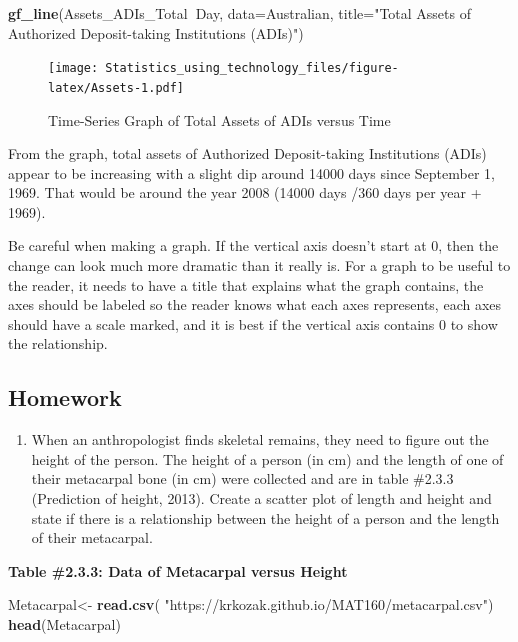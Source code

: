 \documentclass[
]{book}
\newenvironment{Shaded}{\begin{snugshade}}{\end{snugshade}}
\newcommand{\DataTypeTok}[1]{\textcolor[rgb]{0.13,0.29,0.53}{#1}}
\newcommand{\KeywordTok}[1]{\textcolor[rgb]{0.13,0.29,0.53}{\textbf{#1}}}
\newcommand{\NormalTok}[1]{#1}
\newcommand{\OperatorTok}[1]{\textcolor[rgb]{0.81,0.36,0.00}{\textbf{#1}}}
\newcommand{\StringTok}[1]{\textcolor[rgb]{0.31,0.60,0.02}{#1}}
\providecommand{\tightlist}{%
  \setlength{\itemsep}{0pt}\setlength{\parskip}{0pt}}
\begin{document}
\begin{Shaded}
\begin{Highlighting}[]
\KeywordTok{gf_line}\NormalTok{(Assets_ADIs_Total}\OperatorTok{~}\NormalTok{Day, }\DataTypeTok{data=}\NormalTok{Australian, }\DataTypeTok{title=}\StringTok{"Total Assets of Authorized Deposit-taking Institutions (ADIs)"}\NormalTok{)}
\end{Highlighting}
\end{Shaded}

\begin{figure}
\centering
\texttt{[image: Statistics\_using\_technology\_files/figure-latex/Assets-1.pdf]}
\caption{\label{fig:Assets}Time-Series Graph of Total Assets of ADIs versus Time}
\end{figure}

From the graph, total assets of Authorized Deposit-taking Institutions (ADIs) appear to be increasing with a slight dip around 14000 days since September 1, 1969. That would be around the year 2008 (14000 days /360 days per year + 1969).

Be careful when making a graph. If the vertical axis doesn't start at 0, then the change can look much more dramatic than it really is. For a graph to be useful to the reader, it needs to have a title that explains what the graph contains, the axes should be labeled so the reader knows what each axes represents, each axes should have a scale marked, and it is best if the vertical axis contains 0 to show the relationship.

\hypertarget{homework-2}{%
\subsection{Homework}\label{homework-2}}

\begin{enumerate}
\def\labelenumi{\arabic{enumi}.}
\tightlist
\item
  When an anthropologist finds skeletal remains, they need to figure out the height of the person. The height of a person (in cm) and the length of one of their metacarpal bone (in cm) were collected and are in table \#2.3.3 (Prediction of height, 2013). Create a scatter plot of length and height and state if there is a relationship between the height of a person and the length of their metacarpal.
\end{enumerate}

\textbf{Table \#2.3.3: Data of Metacarpal versus Height}

\begin{Shaded}
\begin{Highlighting}[]
\NormalTok{Metacarpal<-}\StringTok{ }\KeywordTok{read.csv}\NormalTok{(}
  \StringTok{"https://krkozak.github.io/MAT160/metacarpal.csv"}\NormalTok{) }
\KeywordTok{head}\NormalTok{(Metacarpal)}
\end{Highlighting}
\end{Shaded}
\end{document}
